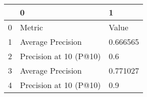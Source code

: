 \begin{tabular}{lll}
\toprule
{} &                       0 &         1 \\
\midrule
0 &                  Metric &     Value \\
1 &       Average Precision &  0.666565 \\
2 &  Precision at 10 (P@10) &       0.6 \\
3 &       Average Precision &  0.771027 \\
4 &  Precision at 10 (P@10) &       0.9 \\
\bottomrule
\end{tabular}
